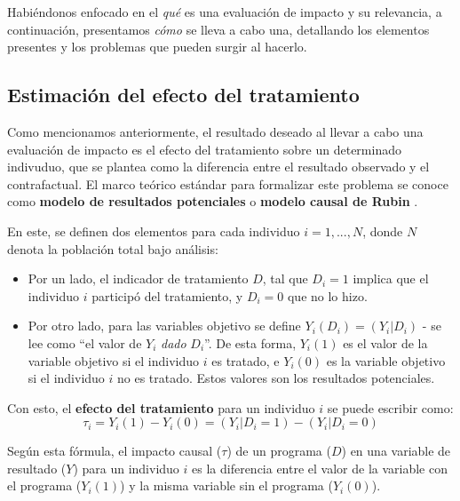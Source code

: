 \documentclass[../../main.tex]{subfiles}
\begin{document}
Habiéndonos enfocado en el \textit{qué} es una evaluación de impacto y su relevancia, a
continuación, presentamos \textit{cómo} se lleva a cabo una, detallando los elementos
presentes y los problemas que pueden surgir al hacerlo.

\subsection{Estimación del efecto del tratamiento}
Como mencionamos anteriormente, el resultado deseado al llevar a cabo una evaluación de
impacto es el efecto del tratamiento sobre un determinado indivuduo, que se plantea como
la diferencia entre el resultado observado y el contrafactual. El marco teórico estándar
para formalizar este problema se conoce como \textbf{modelo de resultados potenciales} o
\textbf{modelo causal de Rubin} \cite{rubin1974}.

En este, se definen dos elementos para cada individuo \(i = 1,...,N\), donde \(N\)
denota la población total bajo análisis:
\begin{itemize}[itemsep=0.2cm]
    \item Por un lado, el indicador de tratamiento \(D\), tal que \(D_i = 1\) implica
    que el individuo \(i\) participó del tratamiento, y \(D_i = 0\) que no lo hizo.
    \item Por otro lado, para las variables objetivo se define \(Y_i(D_i) = (Y_i|D_i)\) -
    se lee como ``el valor de \(Y_i\) \textit{dado} \(D_i\)''. De esta forma, \(Y_i(1)\)
    es el valor de la variable objetivo si el individuo \(i\) es tratado, e \(Y_i(0)\) es la variable
    objetivo si el individuo \(i\) no es tratado. Estos valores son los resultados
    potenciales.
\end{itemize}

Con esto, el \textbf{efecto del tratamiento} para un individuo \(i\) se puede escribir como:
\begin{equation}
    \tau_i = Y_i(1) - Y_i(0) = (Y_i|D_i=1) - (Y_i|D_i=0)
    \label{eq:ite} %
\end{equation}

Según esta fórmula, el impacto causal (\(\tau\)) de un programa (\(D\)) en una variable de
resultado (\(Y\)) para un individuo \(i\) es la diferencia entre el valor de la variable
con el programa (\(Y_i(1)\)) y la misma variable sin el programa (\(Y_i(0)\)).
\end{document}
